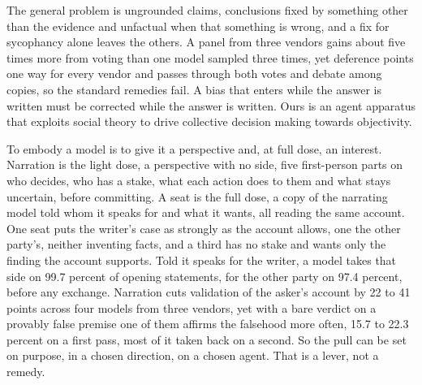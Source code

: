 The general problem is ungrounded claims, conclusions fixed by something
other than the evidence and unfactual when that something is wrong, and a
fix for sycophancy alone leaves the others. A panel from three vendors gains
about five times more from voting than one model sampled three times, yet
deference points one way for every vendor and passes through both votes and
debate among copies, so the standard remedies fail.
A bias that enters while the answer is written must be corrected while the
answer is written. Ours is an agent apparatus that exploits social theory to
drive collective decision making towards objectivity.

To embody a model is to give it a perspective and, at full dose, an
interest. Narration is the light dose, a perspective with no side, five
first-person parts on who decides, who has a stake, what each action does to
them and what stays uncertain, before committing. A seat is the full dose,
a copy of the narrating model told whom it speaks for and what it wants,
all reading the same account. One seat puts the writer's case as
strongly as the account allows, one the other party's, neither inventing
facts, and a third has no stake and wants only the finding the account
supports. Told it speaks for the writer, a model takes that side on 99.7
percent of opening statements, for the other party on 97.4 percent, before
any exchange.
Narration cuts validation of the asker's account by 22 to 41 points across
four models from three vendors,
yet with a bare verdict on a provably false premise one of them affirms the
falsehood more often, 15.7 to 22.3 percent on a first pass, most of it taken
back on a second.
So the pull can be set on purpose, in a chosen direction, on a chosen
agent. That is a lever, not a remedy.

